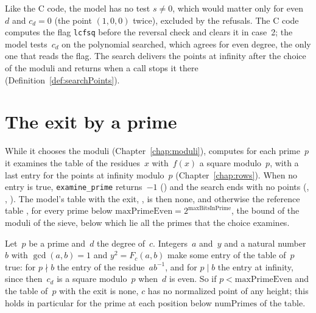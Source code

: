Like the C code, the model has no test $s \ne 0$, which would matter only for even~$d$ and $c_d = 0$
(the point $(1, 0, 0)$ twice), excluded by the refusals. The C code computes the flag \verb|lcfsq|
before the reversal check and clears it in case~2; the model tests~$c_d$ on the polynomial searched,
which agrees for even degree, the only one that reads the flag. The search delivers the points at
infinity after the choice of the moduli and returns when a call stops it there
(Definition~\ref{def:searchPoints}).

\section{The exit by a prime}\label{sec:exitByPrime}

While it chooses the moduli (Chapter~\ref{chap:moduli}), \ratpoints{} computes for each prime~$p$ it
examines the table of the residues~$x$ with~$f(x)$ a square modulo~$p$, with a last entry for the
points at infinity modulo~$p$ (Chapter~\ref{chap:rows}). When no entry is true,
\verb|examine_prime| returns~$-1$ () and the search ends with no
points (, ,
). The model's table with the exit,
, is then none, and otherwise the reference table
, for every prime below
$\mathrm{maxPrimeEven} = 2^{\mathrm{maxBitsInPrime}}$, the bound of the moduli of the sieve, below
which lie all the primes that the choice examines.

\begin{lemma}\label{lem:exitByPrime}
  \leanok
  Let~$p$ be a prime and~$d$ the degree of~$c$. Integers~$a$ and~$y$ and a natural number~$b$ with
  $\gcd(a, b) = 1$ and $y^2 = F_c(a, b)$ make some entry of the table of~$p$ true: for $p \nmid b$
  the entry of the residue~$a b^{-1}$, and for $p \mid b$ the entry at infinity, since then~$c_d$ is
  a square modulo~$p$ when~$d$ is even. So if $p < \mathrm{maxPrimeEven}$ and the table of~$p$ with
  the exit is none, $c$ has no normalized point of any height; this holds in particular for the
  prime at each position below $\mathrm{numPrimes}$ of the table.
\end{lemma}

